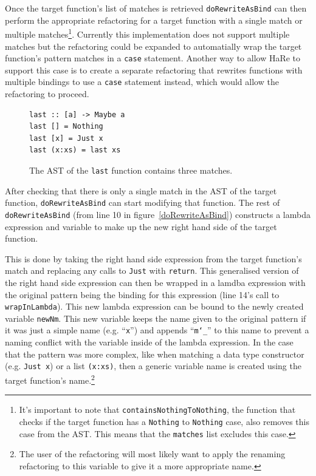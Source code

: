 Once the target function's list of matches is retrieved \texttt{doRewriteAsBind} can then perform the appropriate refactoring for a target function with a single match or multiple matches\footnote{It's important to note that \texttt{containsNothingToNothing}, the function that checks if the target function has a \texttt{Nothing} to \texttt{Nothing} case, also removes this case from the AST. This means that the \texttt{matches} list excludes this case.}. Currently this implementation does not support multiple matches but the refactoring could be expanded to automatially wrap the target function's pattern matches in a \texttt{case} statement. Another way to allow HaRe to support this case is to create a separate refactoring that rewrites functions with multiple bindings to use a \texttt{case} statement instead, which would allow the refactoring to proceed.

\begin{figure}[t]
\begin{lstlisting}
last :: [a] -> Maybe a
last [] = Nothing
last [x] = Just x
last (x:xs) = last xs
\end{lstlisting}
\caption{The AST of the \texttt{last} function contains three matches.}
\label{matchExample}
\end{figure}

After checking that there is only a single match in the AST of the target function, \texttt{doRewriteAsBind} can start modifying that function. The rest of \texttt{doRewriteAsBind} (from line 10 in figure~\ref{doRewriteAsBind}) constructs a lambda expression and variable to make up the new right hand side of the target function. 

This is done by taking the right hand side expression from the target function's match and replacing any calls to \texttt{Just} with \texttt{return}. This generalised version of the right hand side expression can then be wrapped in a lamdba expression with the original pattern being the binding for this expression (line 14's call to \texttt{wrapInLambda}). This new lambda expression can be bound to the newly created variable \texttt{newNm}. This new variable keeps the name given to the original pattern if it was just a simple name (e.g. ``\texttt{x}'') and appends ``\texttt{m\char`_}'' to this name to prevent a naming conflict with the variable inside of the lambda expression. In the case that the pattern was more complex, like when matching a data type constructor (e.g. \texttt{Just x}) or a list \texttt{(x:xs)}, then a generic variable name is created using the target function's name.\footnote{The user of the refactoring will most likely want to apply the renaming refactoring to this variable to give it a more appropriate name.}

